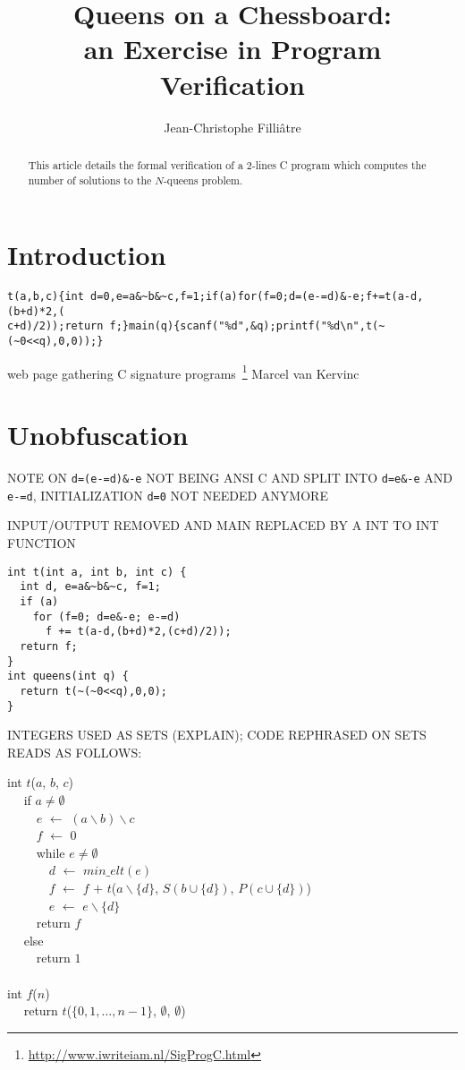 \documentclass[a4paper]{llncs}
\newcommand{\kw}[1]{\textsf{#1}}
\newcommand{\minelt}[1]{\ensuremath{\mathit{min\_elt}(#1)}}
\begin{document}
\title{Queens on a Chessboard: \\
       an Exercise in Program Verification}
\author{Jean-Christophe Filli\^atre}
\maketitle

\begin{abstract}
  This article details the formal verification of a 2-lines C program
  which computes the number of solutions to the $N$-queens problem.
\end{abstract}

\section{Introduction}

\begin{verbatim}
t(a,b,c){int d=0,e=a&~b&~c,f=1;if(a)for(f=0;d=(e-=d)&-e;f+=t(a-d,(b+d)*2,(
c+d)/2));return f;}main(q){scanf("%d",&q);printf("%d\n",t(~(~0<<q),0,0));}
\end{verbatim}

web page gathering C signature
programs~\footnote{\url{http://www.iwriteiam.nl/SigProgC.html}}
Marcel van Kervinc

\section{Unobfuscation}

NOTE ON \verb!d=(e-=d)&-e! NOT BEING ANSI C
AND SPLIT INTO \verb!d=e&-e! AND \verb!e-=d!, INITIALIZATION
\verb!d=0! NOT NEEDED ANYMORE

INPUT/OUTPUT REMOVED AND MAIN REPLACED BY A INT TO INT FUNCTION

\begin{verbatim}
int t(int a, int b, int c) {
  int d, e=a&~b&~c, f=1;
  if (a)
    for (f=0; d=e&-e; e-=d)
      f += t(a-d,(b+d)*2,(c+d)/2));
  return f;
}
int queens(int q) {
  return t(~(~0<<q),0,0);
}
\end{verbatim}

INTEGERS USED AS SETS (EXPLAIN); CODE REPHRASED ON SETS READS AS FOLLOWS:

{\begin{obeylines}
  \kw{int} $t$($a$, $b$, $c$) 
  ~~ \kw{if} $a \not= \emptyset$ 
  ~~~~ $e$ $\leftarrow$ $(a \backslash  b) \backslash c$ 
  ~~~~ $f$ $\leftarrow$ 0 
  ~~~~ \kw{while} $e \not=\emptyset$ 
  ~~~~~~ $d$ $\leftarrow$ $\minelt{e}$ 
  ~~~~~~ $f$ $\leftarrow$ $f$ $+$ $t$($a\backslash \{d\}$, $S(b\cup\{d\})$, $P(c\cup\{d\})$) 
  ~~~~~~ $e$ $\leftarrow$ $e \backslash  \{d\}$ 
  ~~~~ \kw{return} $f$ 
  ~~ \kw{else} 
  ~~~~ \kw{return} $1$ 
  ~~ 
  \kw{int} $f$($n$) 
  ~~ \kw{return} $t$($\{0,1,\dots,n-1\}$, $\emptyset$, $\emptyset$)
\end{obeylines}}
\end{document}
